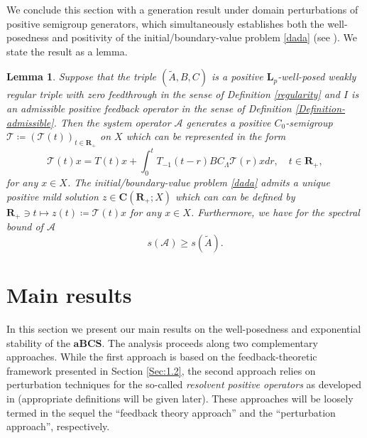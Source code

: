 \documentclass[a4paper,11pt,reqno]{amsart}
\def\calT{{\mathcal{T}}}
\def\calA{{\mathcal{A}}}
\def\R{\mathbf{R}}
\theoremstyle{plain}
\newtheorem{lemma}{Lemma}[section]
\numberwithin{equation}{section}
\begin{document}
We conclude this section with a generation result under domain perturbations of positive semigroup generators, which simultaneously establishes both the well-posedness and positivity of the initial/boundary-value problem \eqref{dada} (see \cite[Theorem A.1]{GANTOUH2026106307}). We state the result as a lemma.
\begin{lemma}\label{theorem-ABC}
Suppose that the triple $(\tilde{{A}},{B},{C})$ is a positive $\bm{L}_p$-well-posed weakly regular triple with zero feedthrough in the sense of Definition \ref{regularity} and $I$ is an admissible positive feedback operator in the sense of Definition \ref{Definition-admissible}. Then the system operator $\calA$ generates a positive $C_0$-semigroup $\calT\coloneqq (\calT(t))_{t\in\R_+}$ on $ {X} $ which can be represented in the form 
\begin{equation*}\label{variation}
\calT(t)x=T(t)x+\int_{0}^{t}{T}_{-1}(t-r){B}{C}_{\Lambda}\calT(r)x dr,\quad t\in\R_+,
\end{equation*}
for any $x\in {X}$. The initial/boundary-value problem \eqref{dada} admits a unique positive mild solution $z\in \bm{C}(\R_+;{X})$ which can can be defined by $\R_+\ni t\mapsto z(t)\coloneqq\calT(t)x$ for any $x\in X$. Furthermore, we have for the spectral bound of $\calA$
\begin{equation}\label{spectral-bound}
s(\calA)\ge s(\tilde{{A}}).
\end{equation}
\end{lemma}

\section{Main results}\label{Sec:2} 

In this section we present our main results on the well-posedness and exponential stability of the $\mathbf{aBCS}$. The analysis proceeds along two complementary approaches. While the first approach is based on the feedback-theoretic framework presented in Section \ref{Sec:1.2}, the second approach relies on perturbation techniques for the so-called \textit{resolvent positive operators} as developed in \cite{MR4711370} (appropriate definitions will be given later). These approaches will be loosely termed in the sequel the ``feedback theory approach'' and the ``perturbation approach'', respectively.
\end{document}
